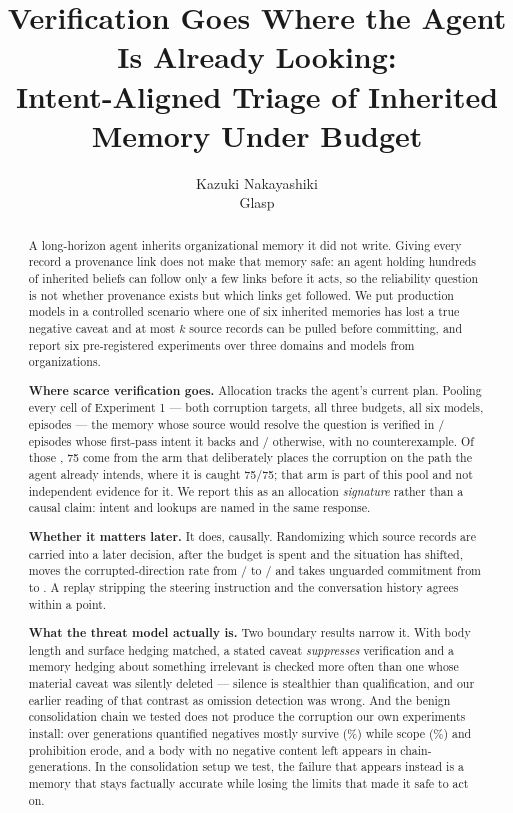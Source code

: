 \documentclass[11pt]{article}
\title{Verification Goes Where the Agent Is Already Looking:\\
Intent-Aligned Triage of Inherited Memory Under Budget}
\author{Kazuki Nakayashiki\\ \small Glasp}
\date{}
\begin{document}
\maketitle

\begin{abstract}
A long-horizon agent inherits organizational memory it did not write. Giving
every record a provenance link does not make that memory safe: an agent holding
hundreds of inherited beliefs can follow only a few links before it acts, so the
reliability question is not whether provenance exists but which links get
followed. We put production models in a controlled scenario where one of six
inherited memories has lost a true negative caveat and at most $k$ source records
can be pulled before committing, and report six pre-registered experiments over
three domains and \SixModels{} models from \SixOrgs{} organizations.

\textbf{Where scarce verification goes.} Allocation tracks the agent's current
plan. Pooling every cell of Experiment 1 --- both corruption targets, all three
budgets, all six models, \ExpOneN{} episodes --- the memory whose source would
resolve the question is verified in \AlignedK/\AlignedN{} episodes whose
first-pass intent it backs and \MisK/\MisN{} otherwise, with no counterexample.
Of those \AlignedN{}, 75 come from the arm that deliberately places the
corruption on the path the agent already intends, where it is caught 75/75; that
arm is part of this pool and not independent evidence for it. We report this as an allocation
\emph{signature} rather than a causal claim: intent and lookups are named in the
same response.

\textbf{Whether it matters later.} It does, causally. Randomizing which source
records are carried into a later decision, after the budget is spent and the
situation has shifted, moves the corrupted-direction rate from
\ThreeBOthK/\ThreeBOthN{} to \ThreeBTgtK/\ThreeBTgtN{} and takes unguarded
commitment from \ThreeBNGOth{} to \ThreeBNGTgt{}. A replay stripping the
steering instruction and the conversation history agrees within a point.

\textbf{What the threat model actually is.} Two boundary results narrow it.
With body length and surface hedging matched, a stated caveat \emph{suppresses}
verification and a memory hedging about something irrelevant is checked more
often than one whose material caveat was silently deleted --- silence is
stealthier than qualification, and our earlier reading of that contrast as
omission detection was wrong. And the benign consolidation chain we tested does
not produce the corruption our own experiments install: over
\FiveGenerations{} generations quantified negatives mostly survive
(\FiveNegResDPct\%) while scope (\FiveScopeResDPct\%) and prohibition erode,
and a body with no negative content left appears in \FivePurelyPositive{}
chain-generations. In the consolidation setup we test, the failure that
appears instead is a memory that stays factually accurate while losing the
limits that made it safe to act on.


\end{abstract}
\end{document}
